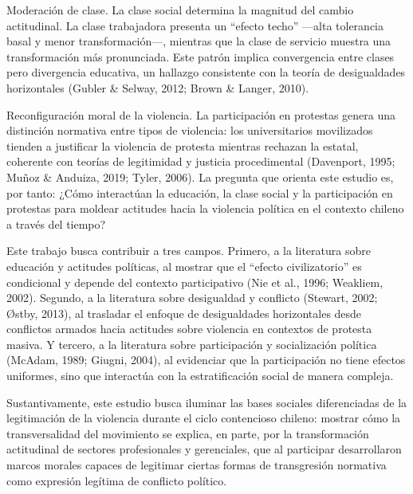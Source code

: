 \documentclass[
  13pt,
]{article}
\begin{document}
Moderación de clase. La clase social determina la magnitud del cambio
actitudinal. La clase trabajadora presenta un ``efecto techo'' ---alta
tolerancia basal y menor transformación---, mientras que la clase de
servicio muestra una transformación más pronunciada. Este patrón implica
convergencia entre clases pero divergencia educativa, un hallazgo
consistente con la teoría de desigualdades horizontales (Gubler \&
Selway, 2012; Brown \& Langer, 2010).

Reconfiguración moral de la violencia. La participación en protestas
genera una distinción normativa entre tipos de violencia: los
universitarios movilizados tienden a justificar la violencia de protesta
mientras rechazan la estatal, coherente con teorías de legitimidad y
justicia procedimental (Davenport, 1995; Muñoz \& Anduiza, 2019; Tyler,
2006). La pregunta que orienta este estudio es, por tanto: ¿Cómo
interactúan la educación, la clase social y la participación en
protestas para moldear actitudes hacia la violencia política en el
contexto chileno a través del tiempo?

Este trabajo busca contribuir a tres campos. Primero, a la literatura
sobre educación y actitudes políticas, al mostrar que el ``efecto
civilizatorio'' es condicional y depende del contexto participativo (Nie
et al., 1996; Weakliem, 2002). Segundo, a la literatura sobre
desigualdad y conflicto (Stewart, 2002; Østby, 2013), al trasladar el
enfoque de desigualdades horizontales desde conflictos armados hacia
actitudes sobre violencia en contextos de protesta masiva. Y tercero, a
la literatura sobre participación y socialización política (McAdam,
1989; Giugni, 2004), al evidenciar que la participación no tiene efectos
uniformes, sino que interactúa con la estratificación social de manera
compleja.

Sustantivamente, este estudio busca iluminar las bases sociales
diferenciadas de la legitimación de la violencia durante el ciclo
contencioso chileno: mostrar cómo la transversalidad del movimiento se
explica, en parte, por la transformación actitudinal de sectores
profesionales y gerenciales, que al participar desarrollaron marcos
morales capaces de legitimar ciertas formas de transgresión normativa
como expresión legítima de conflicto político.
\end{document}
